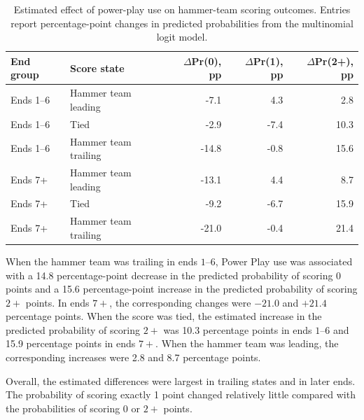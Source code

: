 \documentclass[titlepage, 12pt]{article}
\begin{document}
\begin{table}[htbp]
        \centering
        \caption{Estimated effect of power-play use on hammer-team scoring outcomes.
                Entries report percentage-point changes in predicted probabilities
                from the multinomial logit model.}
        \label{tab:powerplay_effect}
        \small
        \begin{tabular}{llrrr}
                \toprule
                End group & Score state          & $\Delta$Pr(0), pp & $\Delta$Pr(1), pp & $\Delta$Pr(2+), pp \\
                \midrule
                Ends 1--6 & Hammer team leading  & -7.1              & 4.3               & 2.8                \\
                Ends 1--6 & Tied                 & -2.9              & -7.4              & 10.3               \\
                Ends 1--6 & Hammer team trailing & -14.8             & -0.8              & 15.6               \\
                Ends 7+   & Hammer team leading  & -13.1             & 4.4               & 8.7                \\
                Ends 7+   & Tied                 & -9.2              & -6.7              & 15.9               \\
                Ends 7+   & Hammer team trailing & -21.0             & -0.4              & 21.4               \\
                \bottomrule
        \end{tabular}
\end{table}

When the hammer team was trailing in ends \(1\)--\(6\), Power Play use was
associated with a 14.8 percentage-point decrease in the predicted probability
of scoring 0 points and a 15.6 percentage-point increase in the predicted
probability of scoring \(2+\) points. In ends \(7+\), the corresponding changes
were \(-21.0\) and \(+21.4\) percentage points. When the score was tied, the
estimated increase in the predicted probability of scoring \(2+\) was 10.3
percentage points in ends \(1\)--\(6\) and 15.9 percentage points in ends
\(7+\). When the hammer team was leading, the corresponding increases were 2.8
and 8.7 percentage points.

Overall, the estimated differences were largest in trailing states and in later
ends. The probability of scoring exactly 1 point changed relatively little
compared with the probabilities of scoring 0 or \(2+\) points.
\end{document}
